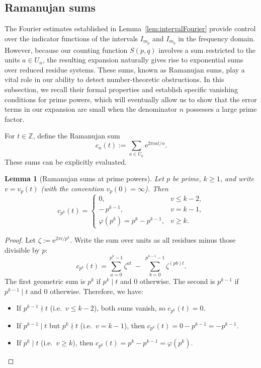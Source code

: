 \documentclass[12pt]{amsart}
\newtheorem{lemma}[theorem]{Lemma}
\newcommand{\Z}{\mathbb{Z}}
\newcommand{\e}{\mathrm{e}}
\begin{document}
\subsection{Ramanujan sums} The Fourier estimates established in Lemma~\ref{lem:intervalFourier} provide control over the indicator functions of the intervals $I_{m_p}$ and $I_{m_q}$ in the frequency domain. However, because our counting function $S(p,q)$ involves a sum restricted to the units $a \in U_n$, the resulting expansion naturally gives rise to exponential sums over reduced residue systems. These sums, known as Ramanujan sums, play a vital role in our ability to detect number-theoretic obstructions. In this subsection, we recall their formal properties and establish specific vanishing conditions for prime powers, which will eventually allow us to show that the error terms in our expansion are small when the denominator $n$ possesses a large prime factor.

For $t\in\Z$, define the Ramanujan sum
\begin{equation}\label{Ramanujan}
c_n(t):=\sum_{a\in U_n}\e^{2\pi i at/n}.
\end{equation}
These sums can be explicitly evaluated.

\begin{lemma}[Ramanujan sums at prime powers]
\label{lem:ramanujanPrimePower}
Let $p$ be prime, $k\ge 1$, and write $v=v_p(t)$ (with the convention $v_p(0)=\infty$).
Then
\[
c_{p^k}(t)=
\begin{cases}
0,& v\le k-2,\\
-\,p^{k-1},& v= k-1,\\
\varphi(p^k)=p^k-p^{k-1},& v\ge k.
\end{cases}
\]
\end{lemma}

\begin{proof}
Let $\zeta:=\e^{2\pi i/p^k}$.
Write the sum over units as all residues minus those divisible by $p$:
\[
c_{p^k}(t)=\sum_{a=0}^{p^k-1}\zeta^{at}\;-\;\sum_{b=0}^{p^{k-1}-1}\zeta^{(pb)t}.
\]
The first geometric sum is $p^k$ if $p^k\mid t$ and $0$ otherwise.
The second is $p^{k-1}$ if $p^{k-1}\mid t$ and $0$ otherwise.
Therefore, we have:
\begin{itemize}
\item If $p^{k-1}\nmid t$ (i.e.\ $v\le k-2$), both sums vanish, so $c_{p^k}(t)=0$.
\item If $p^{k-1}\mid t$ but $p^k\nmid t$ (i.e.\ $v=k-1$), then $c_{p^k}(t)=0-p^{k-1}=-p^{k-1}$.
\item If $p^k\mid t$ (i.e.\ $v\ge k$), then $c_{p^k}(t)=p^k-p^{k-1}=\varphi(p^k)$.
\end{itemize}
\end{proof}
\end{document}
